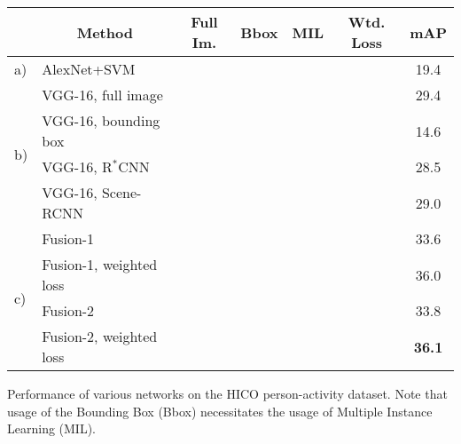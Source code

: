 \documentclass[runningheads]{llncs}
\begin{document}
	\begin{center}
		\begin{tabular}{ll|c|c|c|c|c}
			\hline
			& \multicolumn{1}{c|}{\bf Method} & {\bf Full Im.} & {\bf Bbox} & {\bf MIL} & {\bf Wtd. Loss} & {\bf mAP }	\\ \hline
			a) & AlexNet+SVM~\cite{chao2015hico}	& \checkmark & & & & 19.4						\\ \hline
			\multirow{4}{*}{b)} & VGG-16, full image	& \checkmark & & & & 29.4 \\
			& VGG-16, bounding box & & \checkmark & \checkmark &  & 14.6 \\ 
			& VGG-16, R$^\ast$CNN & & \checkmark & \checkmark & & 28.5 		\\ 
			& VGG-16, Scene-RCNN & \checkmark & \checkmark & \checkmark & & 29.0 \\ \hline
			
			\multirow{4}{*}{c)} & Fusion-1 & \checkmark & \checkmark & \checkmark & & 33.6 \\
			& Fusion-1, weighted loss & \checkmark & \checkmark & \checkmark & \checkmark & 36.0 \\

			& Fusion-2 & \checkmark & \checkmark & \checkmark & & 33.8 \\
			& Fusion-2, weighted loss & \checkmark & \checkmark & \checkmark & \checkmark & {\bf 36.1} \\ \hline
			
		\end{tabular}
	\end{center}
	\caption{Performance of various networks on the HICO person-activity dataset. Note that usage of the Bounding Box (Bbox) necessitates the usage of Multiple Instance Learning (MIL).}
\end{document}
